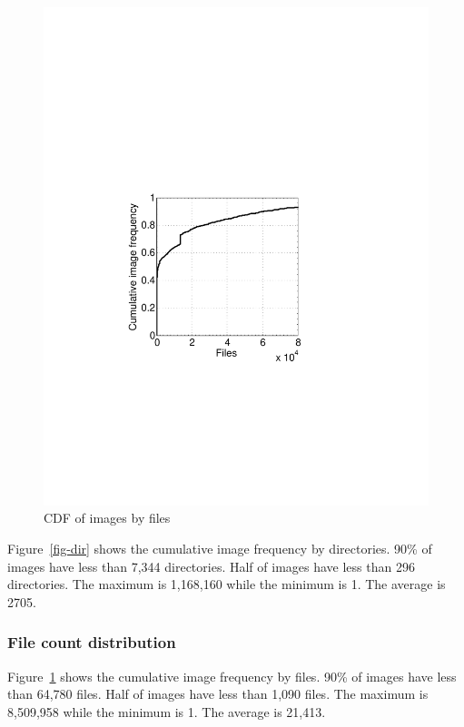 \begin{figure}
\begin{minipage}{0.24\textwidth}
		\includegraphics[width=1\textwidth]{graphs/file.pdf}
		\caption{CDF of images by files}
		\label{fig-file}
	\end{minipage}
\end{figure}

Figure~\ref{fig-dir} shows the cumulative image frequency by directories. 90\% of images have less than 7,344 directories. Half of images have less than 296 directories. The maximum is 1,168,160 while the minimum is 1. The average is 2705. 

\subsubsection{File count distribution}

Figure~\ref{fig-file} shows the cumulative image frequency by files. 90\% of images have less than 64,780 files. Half of images have less than 1,090 files. The maximum is 8,509,958 while the minimum is 1. The average is 21,413. 

